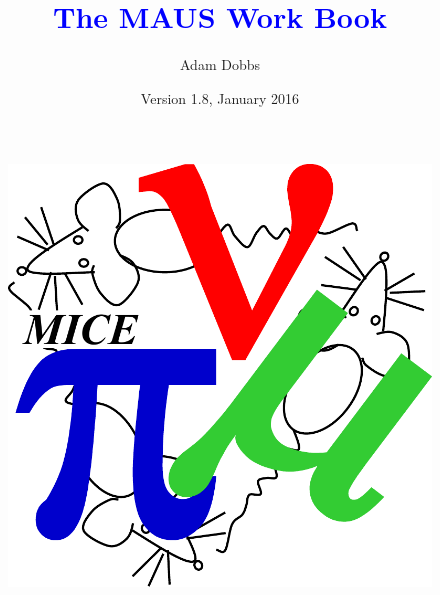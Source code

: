 \documentclass[a4paper,10pt]{article}
\title{\textcolor{blue}{The MAUS Work Book}}
\author{Adam Dobbs}
\date{Version 1.8, January 2016}
\begin{document}
\vspace*{1cm}

{\let\newpage\relax\maketitle}

\reversemarginpar

\thispagestyle{empty}
\vspace{2cm}

\begin{figure}[h]
 \begin{center}
   \includegraphics[width=0.29\linewidth]{./graphics/mice-logo.pdf}
 \end{center}
\end{figure}

\vspace{5cm}

\pagebreak

\tableofcontents

\pagebreak
\end{document}
